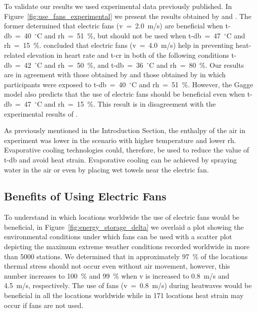 To validate our results we used experimental data previously published.
In Figure~\ref{fig:use_fans_experimental} we present the results obtained by  and .
The former determined that electric fans (\ac{v}~=~2.0~m/s) are beneficial when \ac{t-db}~=~40~$^{\circ}$C and \ac{rh}~=~51~\%, but should not be used when \ac{t-db}~=~47~$^{\circ}$C and \ac{rh}~=~15~\%.
 concluded that electric fans (\ac{v}~=~4.0~m/s) help in preventing heat-related elevation in heart rate and \ac{t-cr} in both of the following conditions \ac{t-db}~=~42~$^{\circ}$C and \ac{rh}~=~50~\%, and \ac{t-db}~=~36~$^{\circ}$C and \ac{rh}~=~80~\%.
Our results are in agreement with those obtained by  and those obtained by  in which participants were exposed to \ac{t-db}~=~40~$^{\circ}$C and \ac{rh}~=~51~\%.
However, the Gagge model also predicts that the use of electric fans should be beneficial even when \ac{t-db}~=~47~$^{\circ}$C and \ac{rh}~=~15~\%.
This result is in disagreement with the experimental results of .

As previously mentioned in the Introduction Section, the enthalpy of the air in  experiment was lower in the scenario with higher temperature and lower \ac{rh}.
Evaporative cooling technologies could, therefore, be used to reduce the value of \ac{t-db} and avoid heat strain.
Evaporative cooling can be achieved by spraying water in the air or even by placing wet towels near the electric fan.

\subsection{Benefits of Using Electric Fans}\label{subsec:use-fans}

To understand in which locations worldwide the use of electric fans would be beneficial, in Figure~\ref{fig:energy_storage_delta} we overlaid a plot showing the environmental conditions under which fans can be used with a scatter plot depicting the maximum extreme weather conditions recorded worldwide in more than 5000 stations.
We determined that in approximately 97~\% of the locations thermal stress should not occur even without air movement, however, this number increases to 100~\% and 99~\% when \ac{v} is increased to 0.8~m/s and 4.5~m/s, respectively.
The use of fans (\ac{v}~=~0.8~m/s) during heatwaves would be beneficial in all the locations worldwide while in 171 locations heat strain may occur if fans are not used.

